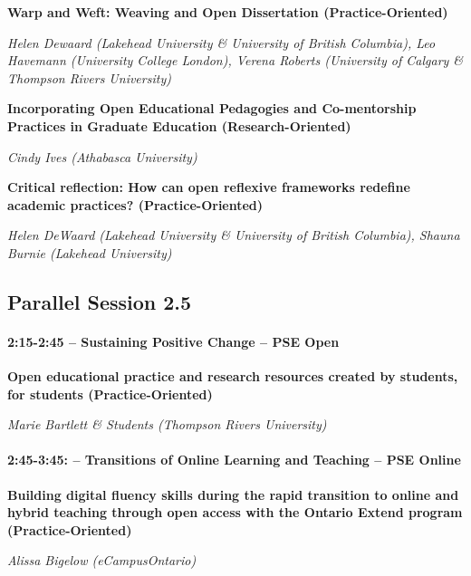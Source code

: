 \documentclass[
]{book}
\begin{document}
\begin{secondary}
\textbf{Warp and Weft: Weaving and Open Dissertation
(Practice-Oriented)}

\emph{Helen Dewaard (Lakehead University \& University of British
Columbia), Leo Havemann (University College London), Verena Roberts
(University of Calgary \& Thompson Rivers University)}
\end{secondary}

\begin{secondary}
\textbf{Incorporating Open Educational Pedagogies and Co-mentorship
Practices in Graduate Education (Research-Oriented)}

\emph{Cindy Ives (Athabasca University)}
\end{secondary}

\begin{secondary}
\textbf{Critical reflection: How can open reflexive frameworks redefine
academic practices? (Practice-Oriented)}

\emph{Helen DeWaard (Lakehead University \& University of British
Columbia), Shauna Burnie (Lakehead University)}
\end{secondary}

\hypertarget{parallel-session-2.5}{%
\subsection*{Parallel Session 2.5}\label{parallel-session-2.5}}

\begin{secondary}
\hypertarget{sustaining-positive-change-pse-open}{%
\paragraph*{2:15-2:45 -- Sustaining Positive Change -- PSE
Open}\label{sustaining-positive-change-pse-open}}

\textbf{Open educational practice and research resources created by
students, for students (Practice-Oriented)}

\emph{Marie Bartlett \& Students (Thompson Rivers University)}
\end{secondary}

\begin{secondary}
\hypertarget{transitions-of-online-learning-and-teaching-pse-online}{%
\paragraph*{2:45-3:45: -- Transitions of Online Learning and Teaching --
PSE
Online}\label{transitions-of-online-learning-and-teaching-pse-online}}

\textbf{Building digital fluency skills during the rapid transition to
online and hybrid teaching through open access with the Ontario Extend
program (Practice-Oriented)}

\emph{Alissa Bigelow (eCampusOntario)}
\end{secondary}
\end{document}
